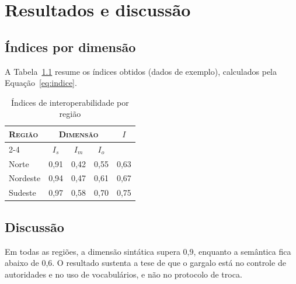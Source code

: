 \chapter{Resultados e discussão}
\label{cap:resultados}


\section{Índices por dimensão}
A Tabela~\ref{tab:indices} resume os índices obtidos (dados de exemplo), calculados pela Equação~\eqref{eq:indice}.

\begin{table}[htb]
  \centering
  \caption{Índices de interoperabilidade por região}
  \label{tab:indices}
  \begin{tabular}{lcccc}
    \toprule
    \multirow{2}{*}{\textsc{Região}} & \multicolumn{3}{c}{\textsc{Dimensão}} & \multirow{2}{*}{$I$} \\
    \cmidrule(lr){2-4}
     & $I_s$ & $I_m$ & $I_o$ & \\
    \midrule
    Norte & 0,91 & 0,42 & 0,55 & 0,63 \\
    Nordeste & 0,94 & 0,47 & 0,61 & 0,67 \\
    Sudeste & 0,97 & 0,58 & 0,70 & 0,75 \\
    \bottomrule
  \end{tabular}
\end{table}

\section{Discussão}
Em todas as regiões, a dimensão sintática supera 0,9, enquanto a semântica fica abaixo de 0,6. O resultado sustenta a tese de que o gargalo está no controle de autoridades e no uso de vocabulários, e não no protocolo de troca.
